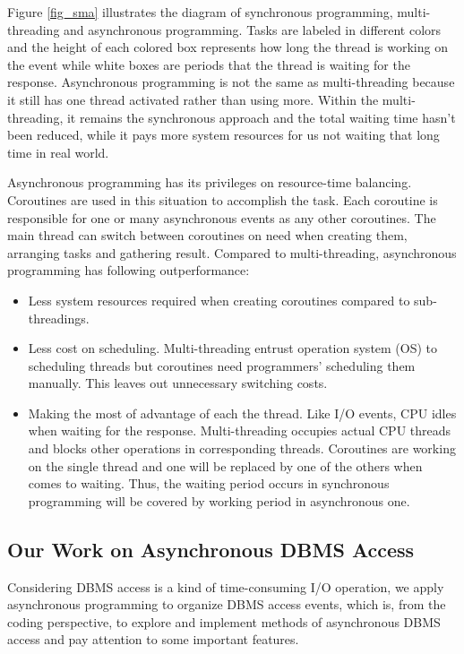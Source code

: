 \documentclass[onecolumn, conference, 12pt]{IEEEtran}
\begin{document}
	Figure \ref{fig_sma} illustrates the diagram of synchronous programming, multi-threading and asynchronous programming. Tasks are labeled in different colors and the height of each colored box represents how long the thread is working on the event while white boxes are periods that the thread is waiting for the response. Asynchronous programming is not the same as multi-threading because it still has one thread activated rather than using more. Within the multi-threading, it remains the synchronous approach and the total waiting time hasn't been reduced, while it pays more system resources for us not waiting that long time in real world. 
	
	Asynchronous programming has its privileges on resource-time balancing. Coroutines are used in this situation to accomplish the task. Each coroutine is responsible for one or many asynchronous events as any other coroutines. The main thread can switch between coroutines on need when creating them, arranging tasks and gathering result. Compared to multi-threading, asynchronous programming has following outperformance:
	\begin{itemize}[]
		\item Less system resources required when creating coroutines compared to sub-threadings. 
		\item Less cost on scheduling. Multi-threading entrust operation system (OS) to scheduling threads but coroutines need programmers' scheduling them manually. This leaves out unnecessary switching costs.
		\item Making the most of advantage of each the thread. Like I/O events, CPU idles when waiting for the response. Multi-threading occupies actual CPU threads and blocks other operations in corresponding threads. Coroutines are working on the single thread and one will be replaced by one of the others when comes to waiting. Thus, the waiting period occurs in synchronous programming will be covered by working period in asynchronous one.
	\end{itemize}
	
	\subsection{Our Work on Asynchronous DBMS Access}
	Considering DBMS access is a kind of time-consuming I/O operation, we apply asynchronous programming to organize DBMS access events, which is, from the coding perspective, to explore and implement methods of asynchronous DBMS access and pay attention to some important features. 
	
\end{document}
